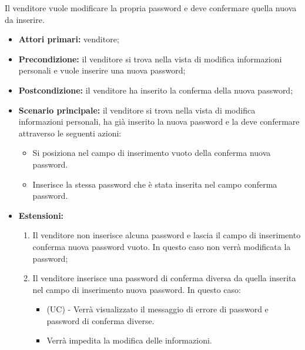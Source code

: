 Il venditore vuole modificare la propria password e deve confermare quella nuova da inserire.
\begin{itemize}
    \item \textbf{Attori primari:} venditore;
    \item \textbf{Precondizione:} il venditore si trova nella vista di modifica informazioni personali e vuole inserire una nuova password;
    \item \textbf{Postcondizione:} il venditore ha inserito la conferma della nuova password;
    \item \textbf{Scenario principale:} il venditore si trova nella vista di modifica informazioni personali, ha già inserito la nuova password e la deve confermare attraverso le seguenti azioni:
        \begin{itemize}
            \item Si posiziona nel campo di inserimento vuoto della conferma nuova password.
            \item Inserisce la stessa password che è stata inserita nel campo conferma password.
        \end{itemize}
    \item \textbf{Estensioni:}
    \begin{enumerate}
    	\item Il venditore non inserisce alcuna password e lascia il campo di inserimento conferma nuova password vuoto. In questo caso non verrà modificata la password;
    	\item Il venditore inserisce una password di conferma diversa da quella inserita nel campo di inserimento nuova password. In questo caso:
    	\begin{itemize}
    		\item (UC) - Verrà visualizzato il messaggio di errore di password e password di conferma diverse.
    		\item Verrà impedita la modifica delle informazioni.
    	\end{itemize}
    \end{enumerate}
\end{itemize}


